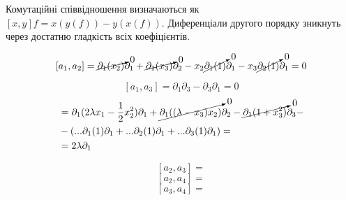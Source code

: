 \documentclass[10pt, a4paper]{article} %
\begin{document}
Комутаційні співвідношення визначаються як $[x,y]f = x(y(f)) - y(x(f))$.
Диференціали другого порядку зникнуть через достатню гладкість всіх коефіцієнтів. 

\[ [a_1, a_2] = \cancelto{0}{\partial_1(x_2)}\partial_1+\cancelto{0}{\partial_1(x_3)}\partial_2 - x_2\cancelto{0}{\partial_1(1)}\partial_1 - x_3\cancelto{0}{\partial_2(1)}\partial_1 = 0\]

\[ [a_1, a_3] = \partial_1\partial_3 - \partial_3\partial_1 = 0\]
\begin{align*}
    [a_1, a_4] &= \partial_1(2\lambda x_1 - \frac{1}{2}x_2^2)\partial_1 + \cancelto{0}{\partial_1((\lambda-x_3)x_2)}\partial_2 - \cancelto{0}{\partial_1(1+x_3^2)}\partial_3 - \\
    &- \left(...\partial_1(1)\partial_1 + ...\partial_2(1)\partial_1 + ...\partial_3(1)\partial_1\right) = \\
    &= 2\lambda\partial_1
\end{align*}

\[ [a_2, a_3] = \]
\[ [a_2, a_4] = \]
\[ [a_3, a_4] = \]
\end{document}
